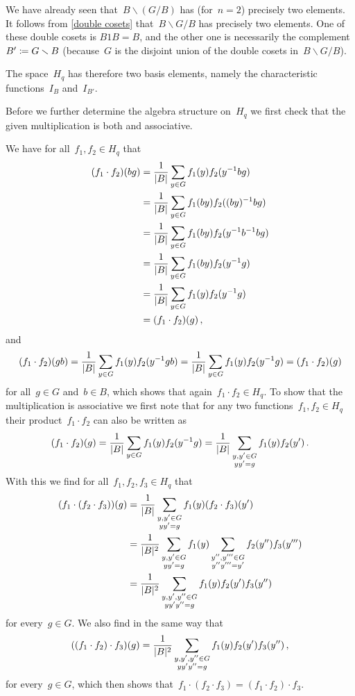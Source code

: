 We have already seen that~$B \backslash (G / B)$ has (for~$n = 2$) precisely two elements.
It follows from \cref{double cosets} that~$B \backslash G / B$ has precisely two elements.
One of these double cosets is $B 1 B = B$, and the other one is necessarily the complement~$B' \coloneqq G \smallsetminus B$ (because~$G$ is the disjoint union of the double cosets in~$B \backslash G / B$).

The space~$H_q$ has therefore two basis elements, namely the characteristic functions~$I_B$ and~$I_{B'}$.

Before we further determine the algebra structure on~$H_q$ we first check that the given multiplication is both {\welldef} and associative.

We have for all~$f_1, f_2 \in H_q$ that
\begin{align*}
      (f_1 \cdot f_2)(bg)
  &=  \frac{1}{\lvert B\rvert} \sum_{y \in G} f_1(y) f_2(y^{-1} b g)  \\
  &=  \frac{1}{\lvert B\rvert} \sum_{y \in G} f_1(by) f_2((by)^{-1} bg) \\
  &=  \frac{1}{\lvert B\rvert} \sum_{y \in G} f_1(by) f_2(y^{-1} b^{-1} bg) \\
  &=  \frac{1}{\lvert B\rvert} \sum_{y \in G} f_1(by) f_2(y^{-1} g) \\
  &=  \frac{1}{\lvert B\rvert} \sum_{y \in G} f_1(y) f_2(y^{-1} g)  \\
  &=  (f_1 \cdot f_2)(g) \,,
\end{align*}
and
\[
    (f_1 \cdot f_2)(gb)
  = \frac{1}{\lvert B\rvert} \sum_{y \in G} f_1(y) f_2(y^{-1} g b)
  = \frac{1}{\lvert B\rvert} \sum_{y \in G} f_1(y) f_2(y^{-1} g)
  = (f_1 \cdot f_2)(g)
\]
for all~$g \in G$ and~$b \in B$, which shows that again~$f_1 \cdot f_2 \in H_q$.
To show that the multiplication is associative we first note that for any two functions~$f_1, f_2 \in H_q$ their product~$f_1 \cdot f_2$ can also be written as
\[
    (f_1 \cdot f_2)(g)
  = \frac{1}{\lvert B\rvert} \sum_{y \in G} f_1(y) f_2(y^{-1} g)
  = \frac{1}{\lvert B\rvert} \sum_{\substack{y, y' \in G \\ y y' = g}} f_1(y) f_2(y') \,.
\]
With this we find for all~$f_1, f_2, f_3 \in H_q$ that
\begin{align*}
      (f_1 \cdot (f_2 \cdot f_3))(g)
  &=  \frac{1}{\lvert B\rvert}
      \sum_{\substack{y, y' \in G \\ y y' = g}}
      f_1(y) (f_2 \cdot f_3)(y')  \\
  &=  \frac{1}{\lvert B\rvert^2}
      \sum_{\substack{y, y' \in G \\ y y' = g}}
      f_1(y)
      \sum_{\substack{y'', y''' \in G \\ y'' y''' = y'}}
      f_2(y'') f_3(y''')  \\
  &=  \frac{1}{\lvert B\rvert^2}
      \sum_{\substack{y, y', y'' \in G \\ y y' y'' = g}}
      f_1(y) f_2(y') f_3(y'')
\end{align*}
for every~$g \in G$.
We also find in the same way that
\[
    ((f_1 \cdot f_2) \cdot f_3)(g)
  = \frac{1}{\lvert B\rvert^2}
    \sum_{\substack{y, y', y'' \in G \\ y y' y'' = g}}
    f_1(y) f_2(y') f_3(y'') \,,
\]
for every~$g \in G$, which then shows that~$f_1 \cdot (f_2 \cdot f_3) = (f_1 \cdot f_2) \cdot f_3$.

